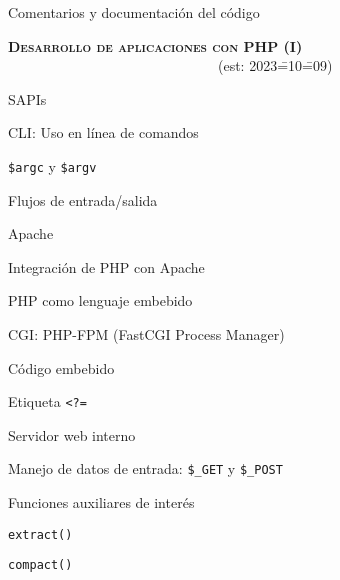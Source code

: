 \begin{longenum}
\begin{longenum}
\begin{longenum}
\begin{longenum}
            \end{longenum}
        \end{longenum}
        \item Comentarios y documentación del código
    \end{longenum}
    \item \textbf{\textsc{Desarrollo de aplicaciones con PHP (I)}} \ \ \ \ \ \ \ \ \ \ \ \ \ \ \ \ \ \ \ \ \ \ \ \ \ \ \ \ \ \ (est: 2023\==10\==09)
    \begin{longenum}
        \item SAPIs
        \begin{longenum}
            \item CLI: Uso en línea de comandos
            \begin{longenum}
                \item \texttt{\$argc} y \texttt{\$argv}
                \item Flujos de entrada/salida \opcional\
            \end{longenum}
            \item Apache \opcional\
            \begin{longenum}
                \item Integración de PHP con Apache
                \item PHP como lenguaje embebido
            \end{longenum}
            \item CGI: PHP-FPM (FastCGI Process Manager) \opcional\
        \end{longenum}
        \item Código embebido
        \begin{longenum}
            \item Etiqueta \texttt{<?=}
            \item Servidor web  interno
        \end{longenum}
        \item Manejo de datos de entrada: \texttt{\$\_GET} y \texttt{\$\_POST}
        \item Funciones auxiliares de interés
        \begin{longenum}
            \item \texttt{extract()}
            \item \texttt{compact()}

\end{longenum}
\end{longenum}
\end{longenum}

